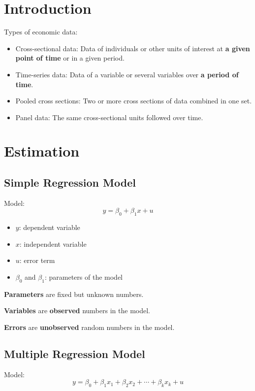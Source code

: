\documentclass[11pt,a4paper]{article}
\begin{document}
\makenotestitle

\tableofcontents
\newpage
{}

\section{Introduction}
Types of economic data:
\begin{itemize}
    \item Cross-sectional data: Data of individuals or other units of interest at \textbf{a given point of time} or in a given period.
    \item Time-series data:  Data of a variable or several variables over \textbf{a period of time}.
    \item Pooled cross sections: Two or more cross sections of data combined in one set.
    \item Panel data: The same cross-sectional units followed over time. 
\end{itemize}

\section{Estimation}
\subsection{Simple Regression Model}
Model:
\[
y = \beta_0 + \beta_1 x + u
\]
\begin{itemize}
    \item $y$: dependent variable
    \item $x$: independent variable
    \item $u$: error term
    \item $\beta_0$ and $\beta_1$: parameters of the model
\end{itemize}

\textbf{Parameters} are fixed but unknown numbers. \par
\textbf{Variables} are \textbf{observed} numbers in the model. \par
\textbf{Errors} are \textbf{unobserved} random numbers in the model.

\subsection{Multiple Regression Model}
Model:
\[
y = \beta_0 + \beta_1 x_1 + \beta_2 x_2 + \cdots + \beta_k x_k + u
\]
\end{document}
